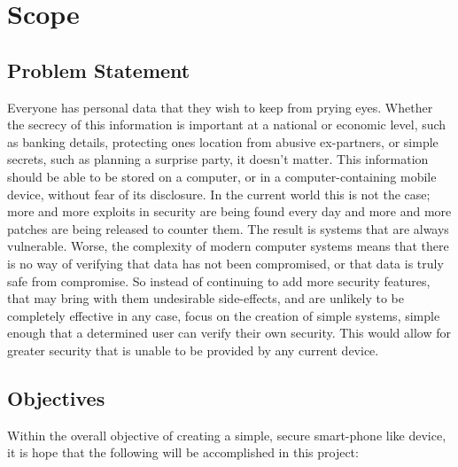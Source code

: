 
\section{Scope}

\label{Ch1 Sec2}


\subsection{Problem Statement}

\label{Ch1 Sec2 Sub1}

Everyone has personal data that they wish to keep from prying eyes.
Whether the secrecy of this information is important at a national or economic level, such as banking details, protecting ones location from abusive ex-partners, or simple secrets, such as planning a surprise party, it doesn't matter.
This information should be able to be stored on a computer, or in a computer-containing mobile device, without fear of its disclosure.
In the current world this is not the case; more and more exploits in security are being found every day and more and more patches are being released to counter them.
The result is systems that are always vulnerable.
Worse, the complexity of modern computer systems means that there is no way of verifying that data has not been compromised, or that data is truly safe from compromise.
So instead of continuing to add more security features, that may bring with them undesirable side-effects, and are unlikely to be completely effective in any case, focus on the creation of simple systems, simple enough that a determined user can verify their own security.
This would allow for greater security that is unable to be provided by any current device.


\subsection{Objectives}

\label{Ch1 Sec2 Sub2}

Within the overall objective of creating a simple, secure smart-phone like device, it is hope that the following will be accomplished in this project:


